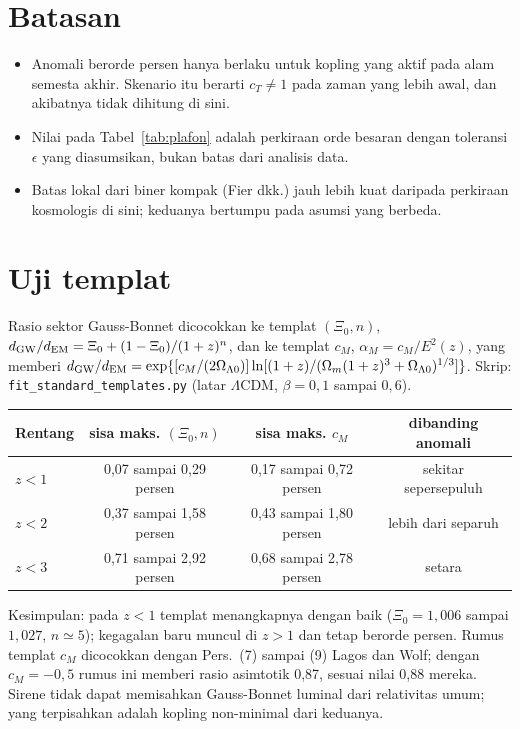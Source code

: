 \documentclass[11pt,a4paper]{article}
\begin{document}
\section{Batasan}
\begin{itemize}[leftmargin=*,itemsep=2pt]
\item Anomali berorde persen hanya berlaku untuk kopling yang aktif pada alam semesta akhir. Skenario itu berarti $c_T\neq1$ pada zaman yang lebih awal, dan akibatnya tidak dihitung di sini.
\item Nilai pada Tabel~\ref{tab:plafon} adalah perkiraan orde besaran dengan toleransi $\epsilon$ yang diasumsikan, bukan batas dari analisis data.
\item Batas lokal dari biner kompak (Fier dkk.) jauh lebih kuat daripada perkiraan kosmologis di sini; keduanya bertumpu pada asumsi yang berbeda.
\end{itemize}

\section{Uji templat}
Rasio sektor Gauss-Bonnet dicocokkan ke templat $(\Xi_0,n)$, $d_{\rm GW}/d_{\rm EM}=\Xi_0+(1-\Xi_0)/(1+z)^n$, dan ke templat $c_M$, $\alpha_M=c_M/E^2(z)$, yang memberi $d_{\rm GW}/d_{\rm EM}=\exp\{[c_M/(2\Omega_{\Lambda0})]\ln[(1+z)/(\Omega_m(1+z)^3+\Omega_{\Lambda0})^{1/3}]\}$. Skrip: \texttt{fit\_standard\_templates.py} (latar $\Lambda$CDM, $\beta=0{,}1$ sampai $0{,}6$).

\begin{center}\small
\begin{tabular}{lccc}\toprule
Rentang & sisa maks. $(\Xi_0,n)$ & sisa maks. $c_M$ & dibanding anomali\\\midrule
$z<1$ & 0,07 sampai 0,29 persen & 0,17 sampai 0,72 persen & sekitar sepersepuluh\\
$z<2$ & 0,37 sampai 1,58 persen & 0,43 sampai 1,80 persen & lebih dari separuh\\
$z<3$ & 0,71 sampai 2,92 persen & 0,68 sampai 2,78 persen & setara\\\bottomrule
\end{tabular}
\end{center}
Kesimpulan: pada $z<1$ templat menangkapnya dengan baik ($\Xi_0=1{,}006$ sampai $1{,}027$, $n\simeq5$); kegagalan baru muncul di $z>1$ dan tetap berorde persen. Rumus templat $c_M$ dicocokkan dengan Pers.~(7) sampai (9) Lagos dan Wolf; dengan $c_M=-0{,}5$ rumus ini memberi rasio asimtotik 0,87, sesuai nilai 0,88 mereka. Sirene tidak dapat memisahkan Gauss-Bonnet luminal dari relativitas umum; yang terpisahkan adalah kopling non-minimal dari keduanya.
\end{document}
